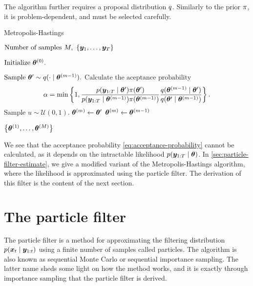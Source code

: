 The algorithm further requires a proposal distribution $q$. Similarly to the prior $\pi$, it is problem-dependent, and must be selected carefully.

\begin{algorithm}[ht]
    \caption{Metropolis-Hastings}
    \label{alg:metropolis-hastings}
    \begin{algorithmic}[1]
        \Input $\text{Number of samples } M,\ \left\{\by_1, \ldots, \by_T\right\}$
        
        \State $\text{Initialize } \bm{\theta}^{(0)}.$
        
            \State $\text{Sample } \bm{\theta}^\prime \sim q(\cdot \mid \bm{\theta}^{(m-1)}).$
            \State $\text{Calculate the aceptance probability } $ \begin{equation} \label{eq:acceptance-probability}
            \alpha = \min \left\{1, \frac{p(\bm{y}_{1:T} \mid \bm{\theta}^\prime) \pi(\bm{\theta}^\prime)}{p(\bm{y}_{1:T} \mid \bm{\theta}^{(m-1)}) \pi(\bm{\theta}^{(m-1)})} \frac{q(\bm{\theta}^{(m-1)} \mid \bm{\theta}^\prime)}{q(\bm{\theta}^\prime \mid \bm{\theta}^{(m-1)})} \right\}.
            \end{equation}
            \State $\text{Sample } u \sim \mathcal{U}(0,1).$
                \State $\bm{\theta}^{(m)} \gets \bm{\theta}^\prime$ 
            \Else
                \State $\bm{\theta}^{(m)} \gets \bm{\theta}^{(m-1)}$ 
            \EndIf
        \EndFor
        
        \Output $\left\{ \bm{\theta}^{(1)}, \ldots, \bm{\theta}^{(M)} \right\}$
    \end{algorithmic}
\end{algorithm}

We see that the acceptance probability \eqref{eq:acceptance-probability} cannot be calculated, as it depends on the intractable likelihood $p(\bm{y}_{1:T} \mid \bm{\theta})$. In \autoref{sec:particle-filter-estimate}, we give a modified variant of the Metropolis-Hastings algorithm, where the likelihood is approximated using the particle filter. The derivation of this filter is the content of the next section.



\section{The particle filter} \label{sec:particle-filter}
The particle filter \citep{particle-filter} is a method for approximating the filtering distribution $p(\bm{x}_t \mid \bm{y}_{1:t})$ using a finite number of samples called particles. The algorithm is also known as sequential Monte Carlo or sequential importance sampling. The latter name sheds some light on how the method works, and it is exactly through importance sampling that the particle filter is derived.

